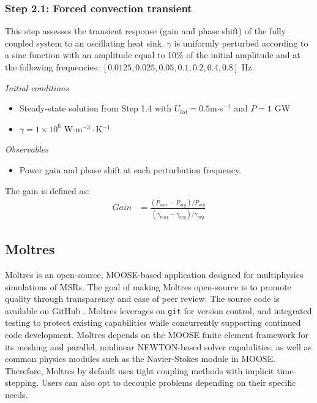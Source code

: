 \subsubsection{Step 2.1: Forced convection transient}

This step assesses the transient response (gain and phase shift) of the fully
coupled system to an oscillating heat sink. $\gamma$ is uniformly perturbed
according to a sine function with an amplitude equal to 10\% of the initial
amplitude and at the following frequencies: $[0.0125, 0.025, 0.05, 0.1, 0.2,
0.4, 0.8]$ Hz.

\textit{Initial conditions}
%
\begin{itemize}
    \itemsep0em
    \item Steady-state solution from Step 1.4 with
    $U_{lid} = 0.5 $m$\cdot$s$^{-1}$ and $P = 1$ GW
    \item $\gamma = 1 \times 10^6$ W$\cdot$m$^{-3}\cdot$K$^{-1}$
\end{itemize}

\textit{Observables}
\begin{itemize}
    \itemsep0em
    \item Power gain and phase shift at each perturbation frequency.
\end{itemize}
%
The gain is defined as:
%
\begin{align}
    Gain &= \frac{(P_{max} - P_{avg})/P_{avg}}{(\gamma_{max} - \gamma_{avg})/
    \gamma_{avg}}
\end{align}

\subsection{Moltres}

Moltres \cite{lindsay_introduction_2018} is an open-source, \gls{MOOSE}-based
application designed for multiphysics simulations of \glspl{MSR}. The goal of
making Moltres open-source is to promote quality through transparency and
ease of peer review. The source code \cite{lindsay_moltres_2017} is available
on GitHub \cite{github_build_2017}. Moltres leverages on \texttt{git} for
version control, and integrated testing to protect existing capabilities while
concurrently supporting continued code development. Moltres depends on the
\gls{MOOSE} finite element framework for its meshing and parallel, nonlinear
NEWTON-based solver capabilities; as well as common physics modules such as the
Navier-Stokes module \cite{peterson_overview_2017} in \gls{MOOSE}. Therefore,
Moltres by default uses tight coupling methods with implicit time-stepping.
Users can also opt to decouple problems depending on their specific needs.

